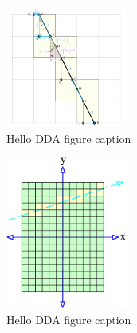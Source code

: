 %
%
	\begin{figure}
	  \centering
	  \includegraphics[width=4cm]{DDA.png}
	  \caption{Hello DDA figure caption}\label{fig:DDA-figsA}
	\end{figure}
	\begin{figure}
	  \centering
	  \includegraphics[width=4cm]{Space_Carving_1.png}
	  \caption{Hello DDA figure caption }\label{fig:SC-one-figsA}
	\end{figure}
